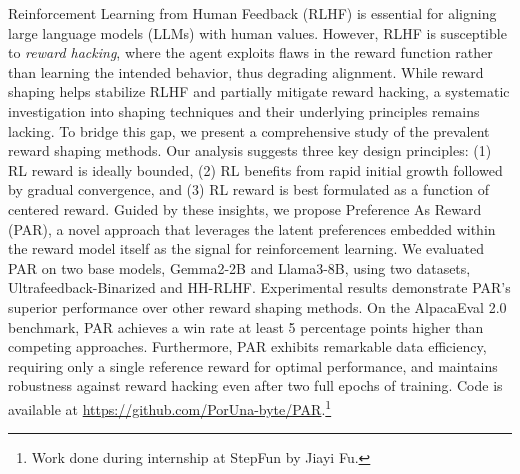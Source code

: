 Reinforcement Learning from Human Feedback (RLHF) is essential for aligning large language models (LLMs) with human values. However, RLHF is susceptible to \emph{reward hacking}, where the agent exploits flaws in the reward function rather than learning the intended behavior, thus degrading alignment. While reward shaping helps stabilize RLHF and partially mitigate reward hacking, a systematic investigation into shaping techniques and their underlying principles remains lacking. To bridge this gap, we present a comprehensive study of the prevalent reward shaping methods. Our analysis suggests three key design principles: (1) RL reward is ideally bounded, (2) RL benefits from rapid initial growth followed by gradual convergence, and (3) RL reward is best formulated as a function of centered reward. Guided by these insights, we propose Preference As Reward (PAR), a novel approach that leverages the latent preferences embedded within the reward model itself as the signal for reinforcement learning. We evaluated PAR on two base models, Gemma2-2B and Llama3-8B, using two datasets, Ultrafeedback-Binarized and HH-RLHF. Experimental results demonstrate PAR's superior performance over other reward shaping methods. On the AlpacaEval 2.0 benchmark, PAR achieves a win rate at least 5 percentage points higher than competing approaches. Furthermore, PAR exhibits remarkable data efficiency, requiring only a single reference reward for optimal performance, and maintains robustness against reward hacking even after two full epochs of training. Code is available at \url{https://github.com/PorUna-byte/PAR}.\footnote{Work done during internship at StepFun by Jiayi Fu.}